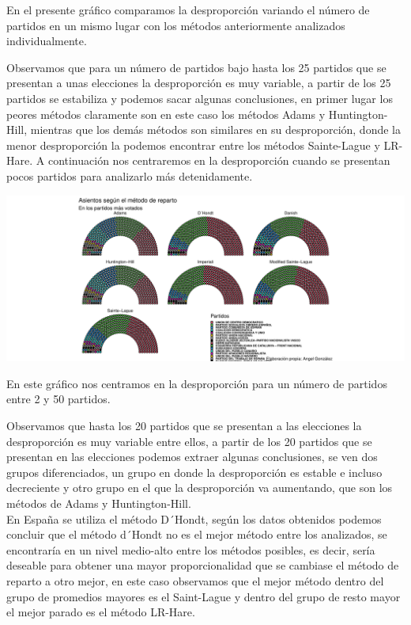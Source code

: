 \documentclass[12pt,a4paper,]{book}
\numberwithin{dummy}{section}
\theoremstyle{ocrenumbox}
\theoremstyle{blacknumex}
\theoremstyle{blacknumbox}
\theoremstyle{ocrenum}
\theoremstyle{ocrenum}
\begin{document}
En el presente gráfico comparamos la desproporción variando el número de
partidos en un mismo lugar con los métodos anteriormente analizados
individualmente.

Observamos que para un número de partidos bajo hasta los 25 partidos que
se presentan a unas elecciones la desproporción es muy variable, a
partir de los 25 partidos se estabiliza y podemos sacar algunas
conclusiones, en primer lugar los peores métodos claramente son en este
caso los métodos Adams y Huntington-Hill, mientras que los demás métodos
son similares en su desproporción, donde la menor desproporción la
podemos encontrar entre los métodos Sainte-Lague y LR-Hare. A
continuación nos centraremos en la desproporción cuando se presentan
pocos partidos para analizarlo más detenidamente.

\begin{center}\includegraphics[width=0.95\linewidth]{figurasR/unnamed-chunk-69-1} \end{center}

En este gráfico nos centramos en la desproporción para un número de
partidos entre 2 y 50 partidos.

Observamos que hasta los 20 partidos que se presentan a las elecciones
la desproporción es muy variable entre ellos, a partir de los 20
partidos que se presentan en las elecciones podemos extraer algunas
conclusiones, se ven dos grupos diferenciados, un grupo en donde la
desproporción es estable e incluso decreciente y otro grupo en el que la
desproporción va aumentando, que son los métodos de Adams y
Huntington-Hill.\\
En España se utiliza el método D´Hondt, según los datos obtenidos
podemos concluir que el método d´Hondt no es el mejor método entre los
analizados, se encontraría en un nivel medio-alto entre los métodos
posibles, es decir, sería deseable para obtener una mayor
proporcionalidad que se cambiase el método de reparto a otro mejor, en
este caso observamos que el mejor método dentro del grupo de promedios
mayores es el Saint-Lague y dentro del grupo de resto mayor el mejor
parado es el método LR-Hare.
\end{document}
